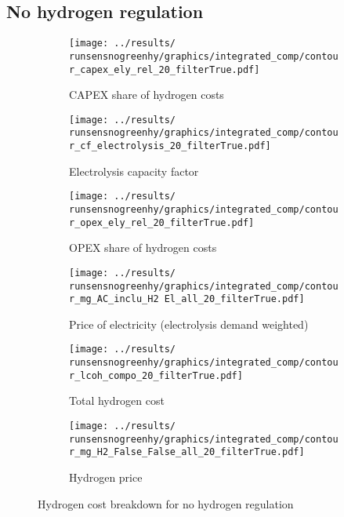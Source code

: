 \subsection{No hydrogen regulation}

\begin{figure*}[h!]
    \centering
    \begin{subfigure}[b]{0.45\linewidth}
        \centering
        \texttt{[image: ../results/\\runsensnogreenhy/graphics/integrated\_comp/contour\_capex\_ely\_rel\_20\_filterTrue.pdf]}
        \caption{CAPEX share of hydrogen costs}
        \label{fig:capex-rel}
    \end{subfigure}
    \hfill
    \begin{subfigure}[b]{0.45\linewidth}
        \centering
        \texttt{[image: ../results/\\runsensnogreenhy/graphics/integrated\_comp/contour\_cf\_electrolysis\_20\_filterTrue.pdf]}
        \caption{Electrolysis capacity factor}
        \label{fig:ely-cf}
    \end{subfigure}
    \hfill
    \begin{subfigure}[b]{0.45\linewidth}
        \centering
        \texttt{[image: ../results/\\runsensnogreenhy/graphics/integrated\_comp/contour\_opex\_ely\_rel\_20\_filterTrue.pdf]}
        \caption{OPEX share of hydrogen costs}
        \label{fig:opex-rel}
    \end{subfigure}
    \hfill
    \begin{subfigure}[b]{0.45\linewidth}
        \centering
        \texttt{[image: ../results/\\runsensnogreenhy/graphics/integrated\_comp/contour\_mg\_AC\_inclu\_H2 El\_all\_20\_filterTrue.pdf]}
        \caption{Price of electricity (electrolysis demand weighted)}
        \label{fig:electricity-price}
    \end{subfigure}
    \hfill
    \begin{subfigure}[b]{0.45\linewidth}
        \centering
        \texttt{[image: ../results/\\runsensnogreenhy/graphics/integrated\_comp/contour\_lcoh\_compo\_20\_filterTrue.pdf]}
        \caption{Total hydrogen cost}
        \label{fig:hydrogen-cost}
    \end{subfigure}
    \hfill
    \begin{subfigure}[b]{0.45\linewidth}
        \centering
        \texttt{[image: ../results/\\runsensnogreenhy/graphics/integrated\_comp/contour\_mg\_H2\_False\_False\_all\_20\_filterTrue.pdf]}
        \caption{Hydrogen price}
        \label{fig:hydrogen-price}
    \end{subfigure}
    \hfill
    
    \caption{Hydrogen cost breakdown for no hydrogen regulation}
    \label{fig:electrolysis_op_comp}
\end{figure*}


\clearpage